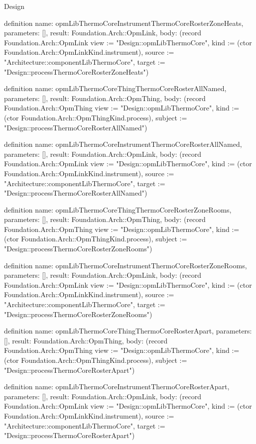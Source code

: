 \begin{lexlean}{Design}
\begin{semanticmodule}
definition{
  name: opmLibThermoCoreInstrumentThermoCoreRosterZoneHeats,
  parameters: [],
  result: Foundation.Arch::OpmLink,
  body: (record Foundation.Arch::OpmLink {view := "Design::opmLibThermoCore", kind := (ctor Foundation.Arch::OpmLinkKind.instrument), source := "Architecture::componentLibThermoCore", target := "Design::processThermoCoreRosterZoneHeats"})
}

definition{
  name: opmLibThermoCoreThingThermoCoreRosterAllNamed,
  parameters: [],
  result: Foundation.Arch::OpmThing,
  body: (record Foundation.Arch::OpmThing {view := "Design::opmLibThermoCore", kind := (ctor Foundation.Arch::OpmThingKind.process), subject := "Design::processThermoCoreRosterAllNamed"})
}

definition{
  name: opmLibThermoCoreInstrumentThermoCoreRosterAllNamed,
  parameters: [],
  result: Foundation.Arch::OpmLink,
  body: (record Foundation.Arch::OpmLink {view := "Design::opmLibThermoCore", kind := (ctor Foundation.Arch::OpmLinkKind.instrument), source := "Architecture::componentLibThermoCore", target := "Design::processThermoCoreRosterAllNamed"})
}

definition{
  name: opmLibThermoCoreThingThermoCoreRosterZoneRooms,
  parameters: [],
  result: Foundation.Arch::OpmThing,
  body: (record Foundation.Arch::OpmThing {view := "Design::opmLibThermoCore", kind := (ctor Foundation.Arch::OpmThingKind.process), subject := "Design::processThermoCoreRosterZoneRooms"})
}

definition{
  name: opmLibThermoCoreInstrumentThermoCoreRosterZoneRooms,
  parameters: [],
  result: Foundation.Arch::OpmLink,
  body: (record Foundation.Arch::OpmLink {view := "Design::opmLibThermoCore", kind := (ctor Foundation.Arch::OpmLinkKind.instrument), source := "Architecture::componentLibThermoCore", target := "Design::processThermoCoreRosterZoneRooms"})
}

definition{
  name: opmLibThermoCoreThingThermoCoreRosterApart,
  parameters: [],
  result: Foundation.Arch::OpmThing,
  body: (record Foundation.Arch::OpmThing {view := "Design::opmLibThermoCore", kind := (ctor Foundation.Arch::OpmThingKind.process), subject := "Design::processThermoCoreRosterApart"})
}

definition{
  name: opmLibThermoCoreInstrumentThermoCoreRosterApart,
  parameters: [],
  result: Foundation.Arch::OpmLink,
  body: (record Foundation.Arch::OpmLink {view := "Design::opmLibThermoCore", kind := (ctor Foundation.Arch::OpmLinkKind.instrument), source := "Architecture::componentLibThermoCore", target := "Design::processThermoCoreRosterApart"})
}


\end{semanticmodule}
\end{lexlean}
